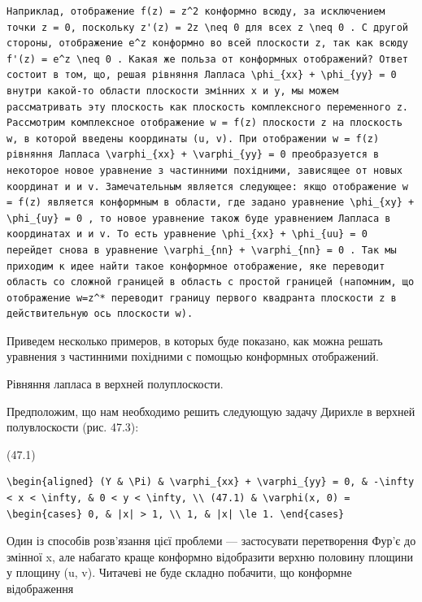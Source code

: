 \documentclass[
]{article}
\begin{document}
{{{\begin{verbatim}
Наприклад, отображение f(z) = z^2 конформно всюду, за исключением точки z = 0, поскольку z'(z) = 2z \neq 0 для всех z \neq 0 . C другой стороны, отображение e^z конформно во всей плоскости z, так как всюду f'(z) = e^z \neq 0 . Какая же польза от конформных отображений? Ответ состоит в том, що, решая рівняння Лапласа \phi_{xx} + \phi_{yy} = 0 внутри какой-то области плоскости змінних x и y, мы можем рассматривать эту плоскость как плоскость комплексного переменного z. Рассмотрим комплексное отображение w = f(z) плоскости z на плоскость w, в которой введены координаты (u, v). При отображении w = f(z) рівняння Лапласа \varphi_{xx} + \varphi_{yy} = 0 преобразуется в некоторое новое уравнение з частинними похідними, зависящее от новых координат и и v. Замечательным является следующее: якщо отображение w = f(z) является конформным в области, где задано уравнение \phi_{xy} + \phi_{uy} = 0 , то новое уравнение також буде уравнением Лапласа в координатах и и v. To есть уравнение \phi_{xx} + \phi_{uu} = 0 перейдет снова в уравнение \varphi_{nn} + \varphi_{nn} = 0 . Так мы приходим к идее найти такое конформное отображение, яке переводит область со сложной границей в область с простой границей (напомним, що отображение w=z^* переводит границу первого квадранта плоскости z в действительную ось плоскости w).
\end{verbatim}

Приведем несколько примеров, в которых буде показано, как можна решать
уравнения з частинними похідними с помощью конформных отображений.

Рівняння лапласа в верхней полуплоскости.

Предположим, що нам необходимо решить следующую задачу Дирихле в верхней
полувлоскости (рис. 47.3):

(47.1)

\begin{verbatim}
\begin{aligned} (Y & \Pi) & \varphi_{xx} + \varphi_{yy} = 0, & -\infty < x < \infty, & 0 < y < \infty, \\ (47.1) & \varphi(x, 0) = \begin{cases} 0, & |x| > 1, \\ 1, & |x| \le 1. \end{cases}
\end{verbatim}

Один із способів розв'язання цієї проблеми --- застосувати перетворення
Фур'є до змінної x, але набагато краще конформно відобразити верхню
половину площини у площину (u, v). Читачеві не буде складно побачити, що
конформне відображення

}}}
\end{document}
